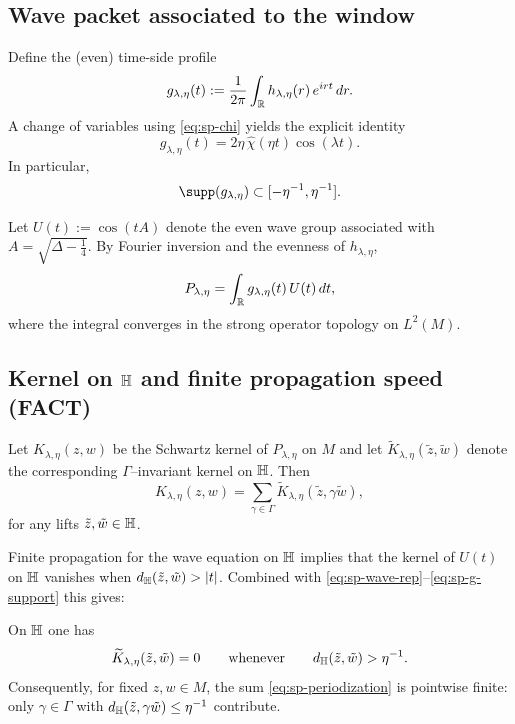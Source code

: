 \subsection{Wave packet associated to the window}\label{subsec:sp-wavepacket}

Define the (even) time-side profile
\begin{equation}\label{eq:sp-g-def}
g_{\lambda,\eta}(t):=\frac{1}{2\pi}\int_{\mathbb{R}} h_{\lambda,\eta}(r)\,e^{irt}\,dr.
\end{equation}
A change of variables using \eqref{eq:sp-chi} yields the explicit identity
\begin{equation}\label{eq:sp-g-explicit}
g_{\lambda,\eta}(t)=2\eta\,\widehat\chi(\eta t)\cos(\lambda t).
\end{equation}
In particular,
\begin{equation}\label{eq:sp-g-support}
\supp(g_{\lambda,\eta})\subset[-\eta^{-1},\eta^{-1}].
\end{equation}

Let $U(t):=\cos(tA)$ denote the even wave group associated with $A=\sqrt{\Delta-\tfrac14}$.
By Fourier inversion and the evenness of $h_{\lambda,\eta}$,
\begin{equation}\label{eq:sp-wave-rep}
P_{\lambda,\eta}=\int_{\mathbb{R}} g_{\lambda,\eta}(t)\,U(t)\,dt,
\end{equation}
where the integral converges in the strong operator topology on $L^2(M)$.

\subsection{Kernel on $\mathbb{H}$ and finite propagation speed (FACT)}\label{subsec:sp-propagation}

Let $K_{\lambda,\eta}(z,w)$ be the Schwartz kernel of $P_{\lambda,\eta}$ on $M$ and let
$\widetilde K_{\lambda,\eta}(\tilde z,\tilde w)$ denote the corresponding $\Gamma$--invariant kernel on $\mathbb{H}$.
Then
\begin{equation}\label{eq:sp-periodization}
K_{\lambda,\eta}(z,w)=\sum_{\gamma\in\Gamma}\widetilde K_{\lambda,\eta}(\tilde z,\gamma\tilde w),
\end{equation}
for any lifts $\tilde z,\tilde w\in\mathbb{H}$.

Finite propagation for the wave equation on $\mathbb{H}$ implies that the kernel of $U(t)$ on $\mathbb{H}$ vanishes when
$d_{\mathbb{H}}(\tilde z,\tilde w)>|t|$. Combined with \eqref{eq:sp-wave-rep}--\eqref{eq:sp-g-support} this gives:

\begin{lemma}\label{lem:sp-support}
On $\mathbb{H}$ one has
\[
\widetilde K_{\lambda,\eta}(\tilde z,\tilde w)=0
\qquad\text{whenever}\qquad d_{\mathbb{H}}(\tilde z,\tilde w)>\eta^{-1}.
\]
Consequently, for fixed $z,w\in M$, the sum \eqref{eq:sp-periodization} is pointwise finite: only
$\gamma\in\Gamma$ with $d_{\mathbb{H}}(\tilde z,\gamma\tilde w)\le \eta^{-1}$ contribute.
\end{lemma}

